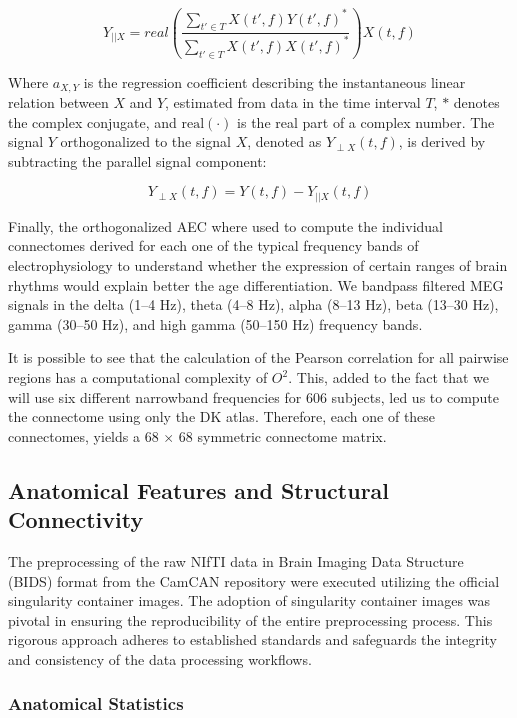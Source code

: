 \documentclass{cys}
\begin{document}
\small
\begin{equation}
Y_{||X} =  real(\frac{\sum_{t'\in T}X(t',f)Y(t',f)^\ast}{\sum_{t'\in T}X(t',f)X(t',f)^\ast}) X(t,f)
\end{equation}

\smallskip
Where $a_{X,Y}$ is the regression coefficient describing the instantaneous linear relation between $X$ and $Y$, estimated from data in the time interval $T$, $\ast$ denotes the complex conjugate, and $\text{real}(\cdot)$ is the real part of a complex number. The signal $Y$ orthogonalized to the signal $X$, denoted as $Y_{\perp X}(t,f)$, is derived by subtracting the parallel signal component:

\begin{equation}
Y_{\perp X}(t,f) = Y(t,f)-Y_{||X}(t,f)
\end{equation}

\smallskip
Finally, the orthogonalized AEC where used to compute the individual connectomes derived for each one of the typical frequency bands of electrophysiology to understand whether the expression of certain ranges of brain rhythms would explain better the age differentiation. We bandpass ﬁltered MEG signals in the delta (1–4 Hz), theta (4–8 Hz), alpha (8–13 Hz), beta (13–30 Hz), gamma (30–50 Hz), and high gamma (50–150 Hz) frequency bands. 

\bigskip
It is possible to see that the calculation of the Pearson correlation for all pairwise regions has a computational complexity of $O^2$. This, added to the fact that we will use six different narrowband frequencies for 606 subjects, led us to compute the connectome using only the DK atlas. Therefore, each one of these connectomes, yields a 68 $\times$ 68 symmetric connectome matrix.


\subsection{Anatomical Features and Structural Connectivity}

The preprocessing of the raw NIfTI data in Brain Imaging Data Structure (BIDS) format from the CamCAN repository were executed utilizing the official singularity container images. The adoption of singularity container images was pivotal in ensuring the reproducibility of the entire preprocessing process. This rigorous approach adheres to established standards and safeguards the integrity and consistency of the data processing workflows.

\bigskip
\subsubsection{Anatomical Statistics}
\end{document}

